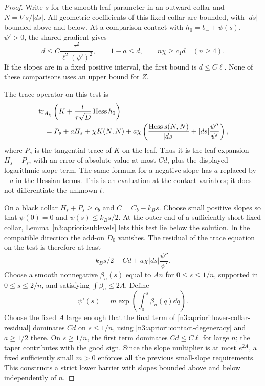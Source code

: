 \begin{proof}
Write $s$ for the smooth leaf parameter in an outward collar and
$N=\nabla s/|ds|$.  All geometric coefficients of this fixed collar
are bounded, with $|ds|$ bounded above and below.  At a comparison
contact with $h_0=b_-+\psi(s)$, $\psi'>0$, the shared gradient gives
\begin{equation}
 d\le C\frac{\tau^2}{\ell^2(\psi')^2},\qquad
 1-a\le d,\qquad n\chi\ge c_1d\quad(n\ge4).
 \label{n3:apriori:contact-degeneracy}
\end{equation}
If the slopes are in a fixed positive interval, the first bound is
$d\le C\ell$.  None of these comparisons uses an upper bound for $Z$.

The trace operator on this test is
\begin{align}
 &\operatorname{tr}_{A_\chi}\left(K+
       \frac{l}{\tau\sqrt D}\operatorname{Hess} h_0\right)\notag\\
 &\quad=P_s+aH_s+\chi K(N,N)
       +a\chi\left(
           \frac{\operatorname{Hess} s(N,N)}{|ds|}
                      +|ds|\frac{\psi''}{\psi'}\right),
 \label{n3:apriori:collar-trace}
\end{align}
where $P_s$ is the tangential trace of $K$ on the leaf.  Thus it is
the leaf expansion $H_s+P_s$, with an error of absolute value at most
$C d$, plus the displayed logarithmic-slope term.  The same formula
for a negative slope has $a$ replaced by $-a$ in the Hessian terms.
This is an evaluation at the contact variables; it does not
differentiate the unknown $t$.

On a black collar $H_s+P_s\ge c_b$ and $C=C_b-k_Bs$.
Choose small positive slopes so that $\psi(0)=0$ and
$\psi(s)\le k_Bs/2$.  At the outer end of a sufficiently short fixed
collar, Lemma~\ref{n3:apriori:sublevels} lets this test lie below the
solution.  In the compatible direction the add-on $D_0$ vanishes.
The residual of the trace equation on the test is therefore at least
\begin{equation}
 k_Bs/2-Cd+a\chi|ds|\frac{\psi''}{\psi'}.
 \label{n3:apriori:lower-collar-residual}
\end{equation}
Choose a smooth nonnegative $\beta_n(s)$ equal to $An$ for
$0\le s\le1/n$, supported in $0\le s\le2/n$, and satisfying
$\int\beta_n\le2A$.  Define
\[
 \psi'(s)=m\exp\left(\int_0^s\beta_n(q)\dd q\right).
\]
Choose the fixed $A$ large enough that the final term of
\eqref{n3:apriori:lower-collar-residual} dominates $Cd$ on $s\le1/n$,
using \eqref{n3:apriori:contact-degeneracy} and $a\ge1/2$ there.
On $s\ge1/n$, the first term dominates $Cd\le C\ell$ for large $n$;
the taper contributes with the good sign.  Since the slope multiplier
is at most $e^{2A}$, a fixed sufficiently small $m>0$ enforces all
the previous small-slope requirements.  This constructs a strict
lower barrier with slopes bounded above and below independently of
$n$.


\end{proof}
